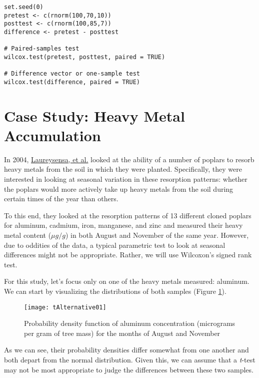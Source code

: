 \begin{framed}
\begin{Verbatim}[samepage=TRUE]
set.seed(0)
pretest <- c(rnorm(100,70,10))
posttest <- c(rnorm(100,85,7))
difference <- pretest - posttest

# Paired-samples test
wilcox.test(pretest, posttest, paired = TRUE)

# Difference vector or one-sample test
wilcox.test(difference, paired = TRUE)
\end{Verbatim}
\end{framed}

\section{Case Study: Heavy Metal Accumulation}

In 2004, \href{http://www.sciencedirect.com/science/article/pii/S0269749104001058}{Laureysensa, et al.} looked at the ability of a number of poplars to resorb heavy metals from the soil in which they were planted. Specifically, they were interested in looking at seasonal variation in these resorption patterns: whether the poplars would more actively take up heavy metals from the soil during certain times of the year than others.

To this end, they looked at the resorption patterns of 13 different cloned poplars for aluminum, cadmium, iron, manganese, and zinc and measured their heavy metal content ($\mu g/g$) in both August and November of the same year. However, due to oddities of the data, a typical parametric test to look at seasonal differences might not be appropriate. Rather, we will use Wilcoxon's signed rank test.

For this study, let's focus only on one of the heavy metals measured: aluminum. We can start by visualizing the distributions of both samples (Figure \ref{fig:tAlt01}).

\begin{figure}[htp]
\texttt{[image: tAlternative01]}
\caption{Probability density function of aluminum concentration (micrograms per gram of tree mass) for the months of August and November}
\label{fig:tAlt01}
\end{figure}

As we can see, their probability densities differ somewhat from one another and both depart from the normal distribution. Given this, we can assume that a \textit{t}-test may not be most appropriate to judge the differences between these two samples.


